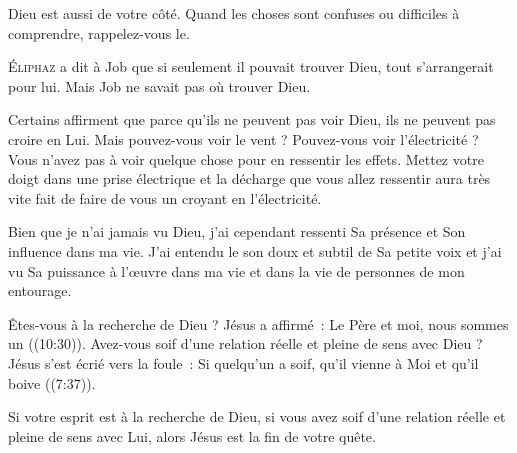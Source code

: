 Dieu est aussi de votre côté.
 Quand les choses sont confuses ou difficiles à comprendre, rappelez-vous le.

\dvrule






\lettrine{É}{liphaz} a dit à Job que si seulement il pouvait trouver Dieu,
 tout s'arrangerait pour lui. Mais Job ne savait pas où trouver Dieu.

Certains affirment que parce qu'ils ne peuvent pas voir Dieu,
 ils ne peuvent pas croire en Lui. Mais pouvez-vous voir le vent ?
 Pouvez-vous voir l'électricité ?
 Vous n'avez pas à voir quelque chose pour en ressentir les effets.
 Mettez votre doigt dans une prise électrique et la décharge
 que vous allez ressentir aura très vite fait de faire de vous
 un \Og croyant \Fg{} en l'électricité.

Bien que je n'ai jamais vu Dieu, j'ai cependant ressenti Sa présence
 et Son influence dans ma vie.
 J'ai entendu le son doux et subtil de Sa petite voix
 et j'ai vu Sa puissance à l'\oe{}uvre dans ma vie
 et dans la vie de personnes de mon entourage.

Êtes-vous à la recherche de Dieu ? Jésus a affirmé~:
 \Og Le Père et moi, nous sommes un \Fg{} ((10:30)).
 Avez-vous soif d'une relation réelle et pleine de sens avec Dieu ?
 Jésus s'est écrié vers la foule~:
 \Og Si quelqu'un a soif, qu'il vienne à Moi et qu'il boive \Fg{}
 ((7:37)).

Si votre esprit est à la recherche de Dieu, si vous avez soif
 d'une relation réelle et pleine de sens avec Lui,
 alors Jésus est la fin de votre quête.


\dvrule



